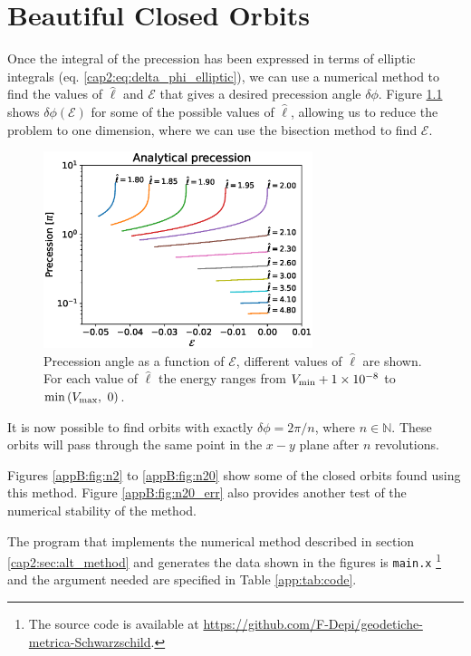 \chapter{Beautiful Closed Orbits}
\label{app:beautiful}

Once the integral of the precession has been expressed in terms of elliptic
integrals (eq. \ref{cap2:eq:delta_phi_elliptic}), we can use a numerical method
to find the values of $\hat \ell$ and $\mathcal E$ that gives a desired
precession angle $\delta \phi$.
Figure \ref{app:fig:prec_theory} shows $\delta \phi (\mathcal E)$ for some of
the possible values of $\hat \ell$, allowing us to reduce the problem to one
dimension, where we can use the bisection method to find $\mathcal E$.

\begin{figure}[h]
    \centering
    \includegraphics[width=0.7\textwidth]{Figures/chapter2/prec_theory.eps}
    \caption{Precession angle as a function of $\mathcal E$, different values
    of $\hat \ell$ are shown. \\
    For each value of $\hat \ell$ the energy ranges from $V_{\rm min} + 
    \num{1e-8}$ to $\min{(V_{\rm max}, ~0)}$.}
    \label{app:fig:prec_theory}
\end{figure}

It is now possible to find orbits with exactly $\delta \phi = 2 \pi / n$,
where $n \in \mathbb{N}$.
These orbits will pass through the same point in the $x-y$ plane after $n$
revolutions.

Figures \ref{appB:fig:n2} to \ref{appB:fig:n20}
show some of the closed orbits found using this method.
Figure \ref{appB:fig:n20_err} also provides another test of the numerical
stability of the method.

The program that implements the numerical method described in section
\ref{cap2:sec:alt_method} and generates the data shown in the figures is
\texttt{main.x}
\footnote{The source code is available at
\url{https://github.com/F-Depi/geodetiche-metrica-Schwarzschild}.}
and the argument needed are specified in Table \ref{app:tab:code}.

